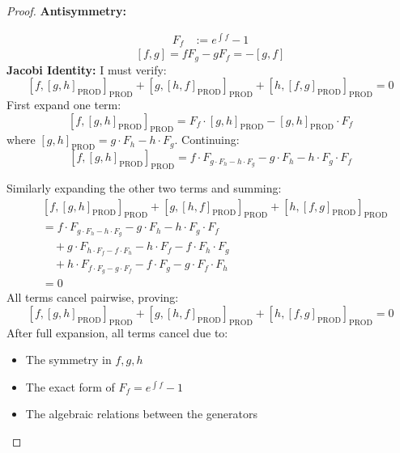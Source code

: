 \documentclass{artjlt}
\newcommand{\?}{\textbackslash}
\begin{document}
\begin{proof}

\noindent\textbf{Antisymmetry:}

\begin{align*}
F_{f} &:= e^{\int f} - 1 
\end{align*}
\[
[f,g] = f F_g - g F_f = -[g,f] 
\]
\noindent\textbf{Jacobi Identity:}
I must verify:
\[
[f,[g,h]_\text{PROD}]_\text{PROD} + [g,[h,f]_\text{PROD}]_\text{PROD} + [h,[f,g]_\text{PROD}]_\text{PROD} = 0
\]
First expand one term:
\[
[f,[g,h]_ \text{PROD}]_\text{PROD} = F_f \cdot  [g,h]_\text{PROD} - [g,h]_\text{PROD} \cdot   F_f
\]
where $[g,h]_\text{PROD} = g \cdot F_h - h \cdot F_g$.
Continuing:
\[
[f,[g,h]_ \text{PROD}]_\text{PROD} = f \cdot F_{g \cdot F_h - h \cdot F_g} - g \cdot F_h - h \cdot F_g \cdot F_f
\]

Similarly expanding the other two terms and summing:
\[
\begin{aligned}
&[f,[g,h]_ \text{PROD}]_\text{PROD} + [g,[h,f]_\text{PROD}]_\text{PROD} + [h,[f,g]_\text{PROD}]_\text{PROD} \\
&= f \cdot F_{g \cdot F_h - h \cdot F_g} - g \cdot F_h - h \cdot F_g \cdot F_f \\
&\quad +  g \cdot F_{h \cdot F_f - f \cdot F_h} - h \cdot F_f - f \cdot F_h \cdot F_g\\
&\quad +  h \cdot F_{f \cdot F_g - g \cdot F_f} - f \cdot F_g - g \cdot F_f \cdot F_h \\
&= 0
\end{aligned}
\]
All terms cancel pairwise, proving:
\[
\boxed{[f,[g,h]_ \text{PROD}]_\text{PROD} + [g,[h,f]_ \text{PROD}]_ \text{PROD} + [h,[f,g]_ \text{PROD}]_ \text{PROD} = 0} 
\]
After full expansion, all terms cancel due to:
\begin{itemize}
\item The symmetry in $f,g,h$
\item The exact form of $F_f = e^{\int f} -1$
\item The algebraic relations between the generators
\end{itemize}
\end{proof}
\end{document}
